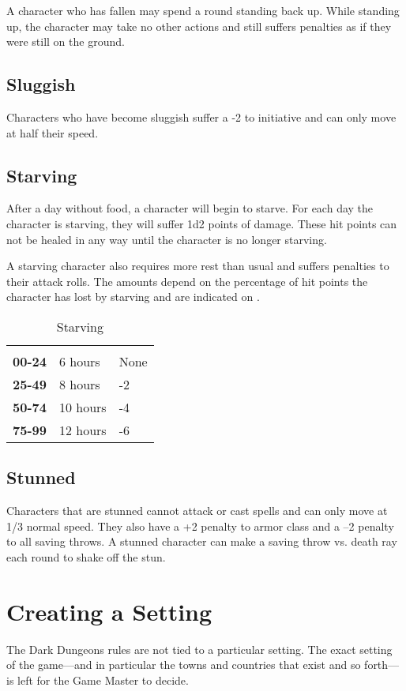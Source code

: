 \begin{multicols*}{2}
A character who has fallen may spend a round standing back up. While standing up, the character may take no other actions and still suffers penalties as if they were still on the ground.

\subsection{Sluggish}\label{sec:Sluggish}
Characters who have become sluggish suffer a -2 to initiative and can only move at half their speed.

\subsection{Starving}
After a day without food, a character will begin to starve. For each day the character is starving, they will suffer 1d2 points of damage. These hit points can not be healed in any way until the character is no longer starving.

A starving character also requires more rest than usual and suffers penalties to their attack rolls. The amounts depend on the percentage of hit points the character has lost by starving and are indicated on .

\begin {table}[H]
  \caption{Starving}\label{tab:Starving}
  \begin{tabularx}{\columnwidth}{>{\bfseries}YYY}
		 &  & \\
		00-24 & 6 hours & None\\
		25-49 & 8 hours & -2\\
		50-74 & 10 hours & -4\\
		75-99 & 12 hours & -6\
  \end {tabularx}
\end {table}

\subsection{Stunned}\label{sec:Stunned}
Characters that are stunned cannot attack or cast spells and can only move at 1/3 normal speed. They also have a +2 penalty to armor class and a –2 penalty to all saving throws. A stunned character can make a saving throw vs. death ray each round to shake off the stun.

\section{Creating a Setting}
The Dark Dungeons rules are not tied to a particular setting. The exact setting of the game—and in particular the towns and countries that exist and so forth—is left for the Game Master to decide.


\end{multicols*}
